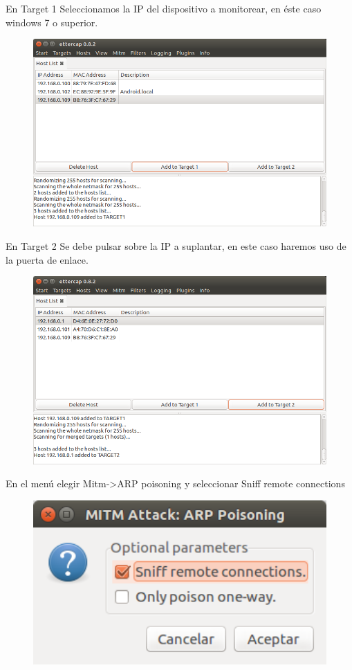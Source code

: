 \documentclass{article}
\begin{document}
En Target 1 Seleccionamos la IP del dispositivo a monitorear, en \'este caso windows 7 o superior.

\begin{figure}[H]
\centering
\includegraphics[width=1\textwidth]{03-TARGET1}
\end{figure}

En Target 2 Se debe pulsar sobre la IP a suplantar, en este caso haremos uso de la puerta de enlace.
\begin{figure}[H]
\centering
\includegraphics[width=1\textwidth]{04-TARGET2}
\end{figure}

En el men\'u elegir Mitm->ARP poisoning  y seleccionar Sniff remote connections
\begin{figure}[H]
\centering
\includegraphics[width=1\textwidth]{05-ARPPOISONING}
\end{figure}
\end{document}
